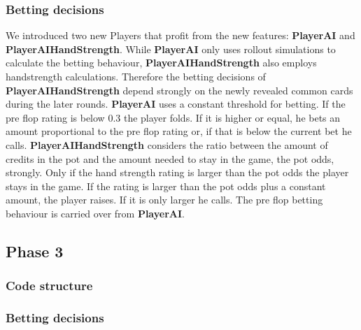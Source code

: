 \subsubsection{Betting decisions}

We introduced two new Players that profit from the new features: \textbf{PlayerAI} and \textbf{PlayerAIHandStrength}. While \textbf{PlayerAI} only uses rollout simulations to calculate the betting behaviour, \textbf{PlayerAIHandStrength} also employs handstrength calculations. Therefore the betting decisions of \textbf{PlayerAIHandStrength} depend strongly on the newly revealed common cards during the later rounds.
\textbf{PlayerAI} uses a constant threshold for betting. If the pre flop rating is below 0.3 the player folds. If it is higher or equal, he bets an amount proportional to the pre flop rating or, if that is below the current bet he calls.
\textbf{PlayerAIHandStrength} considers the ratio between the amount of credits in the pot and the amount needed to stay in the game, the pot odds, strongly. Only if the hand strength rating is larger than the pot odds the player stays in the game. If the rating is larger than the pot odds plus a constant amount, the player raises. If it is only larger he calls. The pre flop betting behaviour is carried over from \textbf{PlayerAI}.  

\subsection{Phase 3}

\subsubsection{Code structure}

\subsubsection{Betting decisions}


